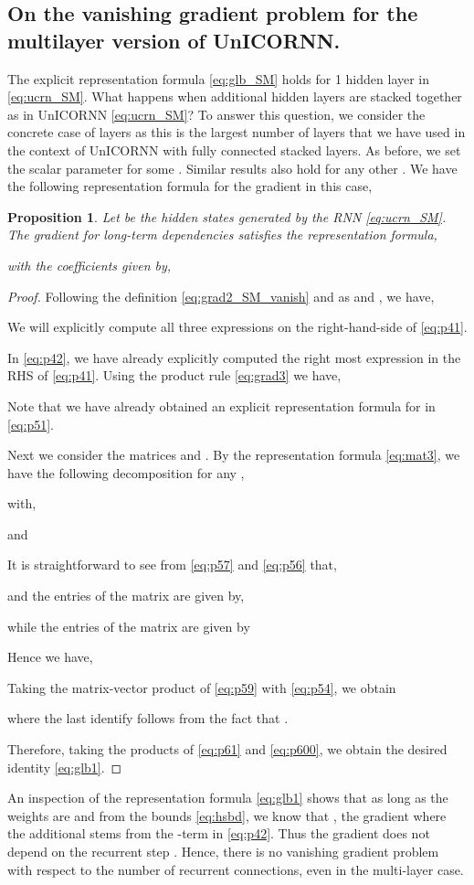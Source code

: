 \documentclass{article}
\newtheorem{proposition}[theorem]{Proposition}
\begin{document}
 \subsection{On the vanishing gradient problem for the multilayer version of UnICORNN.}
 The explicit representation formula \eqref{eq:glb_SM} holds for 1 hidden layer in \eqref{eq:ucrn_SM}. What happens when additional hidden layers are stacked together as in UnICORNN \eqref{eq:ucrn_SM}? To answer this question, we consider the concrete case of  layers as this is the largest number of layers that we have used in the context of UnICORNN with fully connected stacked layers. As before, we set the scalar parameter  for some . Similar results also hold for any other . We have the following representation formula for the gradient in this case,
 \begin{proposition}
\label{prop:5}
Let  be the hidden states generated by the RNN \eqref{eq:ucrn_SM}. The gradient for long-term dependencies satisfies the representation formula,

 with the coefficients given by,
 
\end{proposition}
\begin{proof}
Following the definition \eqref{eq:grad2_SM_vanish} and as  and , we have,

We will explicitly compute all three expressions on the right-hand-side of \eqref{eq:p41}.

In \eqref{eq:p42}, we have already explicitly computed the right most expression in the RHS of \eqref{eq:p41}. 
Using the product rule \eqref{eq:grad3} we have,

Note that we have already obtained an explicit representation formula for  in \eqref{eq:p51}. 

Next we consider the matrices  and . By the representation formula \eqref{eq:mat3}, we have the following decomposition for any ,

with,

and

It is straightforward to see from \eqref{eq:p57} and \eqref{eq:p56} that,

and the entries of the  matrix  are given by,

while the entries of the  matrix  are given by


Hence we have,

Taking the matrix-vector product of \eqref{eq:p59} with \eqref{eq:p54}, we obtain

where the last identify follows from the fact that .

 Therefore, taking the products of \eqref{eq:p61} and \eqref{eq:p600}, we obtain the desired identity \eqref{eq:glb1}. 
 
\end{proof}
An inspection of the representation formula \eqref{eq:glb1} shows that as long as the weights are  and from the bounds \eqref{eq:hsbd}, we know that , the gradient 
where the additional  stems from the -term in \eqref{eq:p42}. Thus the gradient does not depend on the recurrent step . Hence, there is no vanishing gradient problem with respect to the number of recurrent connections, even in the multi-layer case. 
\end{document}
